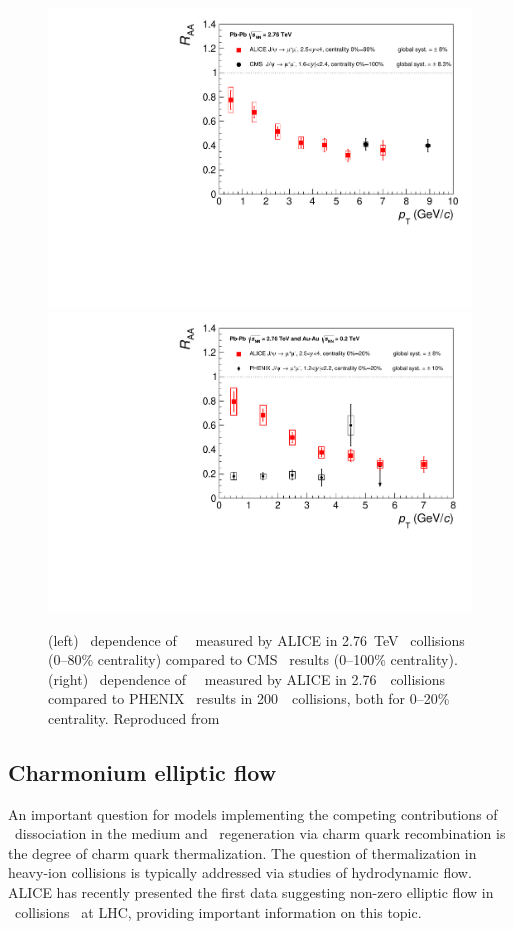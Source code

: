 \begin{figure}[h!]
\begin{center}
\includegraphics[width=0.49\linewidth,keepaspectratio]{qqbarfigures/RAAPtvsModels1.pdf}
\includegraphics[width=0.49\linewidth,keepaspectratio]{qqbarfigures/RAAPtvsModels2.pdf}
\caption{ \label{fig:GR:raaexp2}
(left) \pT\ dependence of \jpsi\ \Raa\ measured by ALICE in 2.76~TeV \PbPb\
collisions (0--80\% centrality) compared to CMS~\cite{Chatrchyan:2012np}
results (0--100\% centrality).
(right) \pT\ dependence of \jpsi\ \Raa\ measured by ALICE
in 2.76\TeV\ \PbPb\ collisions compared to PHENIX~\cite{Adare:2011yf}
results in 200\GeV\ \AuAu\ collisions, both for 0--20\% centrality.  Reproduced from~\cite{Abelev:2013ila}}
\end{center}
\end{figure}


\subsection{Charmonium elliptic flow}

An important question for models implementing the competing contributions of
\jpsi\ dissociation in the medium and \jpsi\ regeneration via charm quark recombination is
the degree of charm quark thermalization. The question of thermalization in heavy-ion
collisions is typically addressed via studies of hydrodynamic flow.
ALICE has recently presented the first data
suggesting non-zero elliptic flow in \PbPb\ collisions~\cite{ALICE:2013xna} at LHC,
providing important information on this topic.

